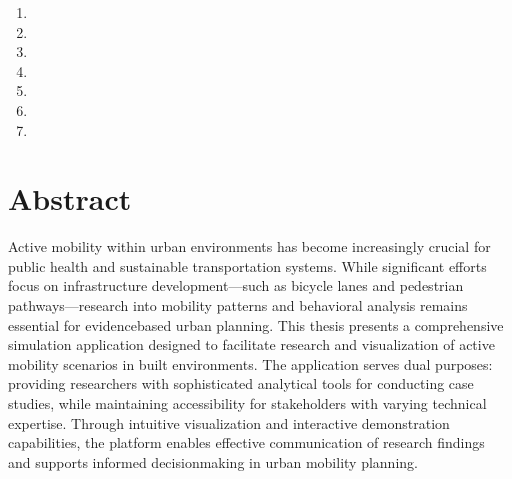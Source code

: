 \documentclass[letterpaper,10pt,english]{jupyterBook}
\begin{document}
\begin{DUlineblock}{0em}
\item[] 
\end{DUlineblock}
\begin{enumerate}
%
\item {} 
\sphinxAtStartPar
{}

\item {} 
\sphinxAtStartPar
{}

\item {} 
\sphinxAtStartPar
{}

\item {} 
\sphinxAtStartPar
{}

\item {} 
\sphinxAtStartPar
{}

\item {} 
\sphinxAtStartPar
{}

\item {} 
\sphinxAtStartPar
{}

\end{enumerate}

\sphinxstepscope


\chapter{Abstract}
\label{\detokenize{Abstact:abstract}}\label{\detokenize{Abstact::doc}}
\sphinxAtStartPar
Active mobility within urban environments has become increasingly crucial for public health and sustainable transportation systems. While significant efforts focus on infrastructure development—such as bicycle lanes and pedestrian pathways—research into mobility patterns and behavioral analysis remains essential for evidence\sphinxhyphen{}based urban planning. This thesis presents a comprehensive simulation application designed to facilitate research and visualization of active mobility scenarios in built environments. The application serves dual purposes: providing researchers with sophisticated analytical tools for conducting case studies, while maintaining accessibility for stakeholders with varying technical expertise. Through intuitive visualization and interactive demonstration capabilities, the platform enables effective communication of research findings and supports informed decision\sphinxhyphen{}making in urban mobility planning.
\end{document}
